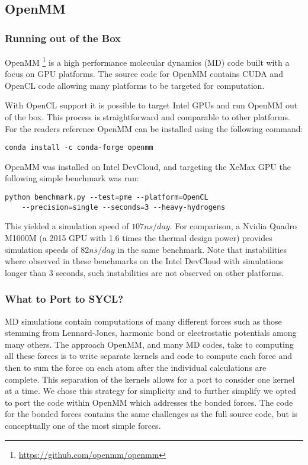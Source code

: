 


\subsection{OpenMM}

\subsubsection{Running out of the Box}

OpenMM \footnote{\url{https://github.com/openmm/openmm}} is a high performance molecular dynamics (MD) code built with a focus on GPU platforms. The source code for OpenMM contains CUDA and OpenCL code allowing many platforms to be targeted for computation.

With OpenCL support it is possible to target Intel GPUs and run OpenMM out of the box. This process is straightforward and comparable to other platforms. For the readers reference OpenMM can be installed using the following command:

\begin{lstlisting}
conda install -c conda-forge openmm
\end{lstlisting}

OpenMM was installed on Intel DevCloud, and targeting the XeMax GPU the following simple benchmark was run:

\begin{lstlisting}
python benchmark.py --test=pme --platform=OpenCL
    --precision=single --seconds=3 --heavy-hydrogens
\end{lstlisting}

This yielded a simulation speed of $107 ns/day$. For comparison, a Nvidia Quadro M1000M (a 2015 GPU with 1.6 times the thermal design power) provides simulation speeds of $82 ns/day$ in the same benchmark. Note that instabilities where observed in these benchmarks on the Intel DevCloud with simulations longer than 3 seconds, such instabilities are not observed on other platforms.

\subsubsection{What to Port to SYCL?}

MD simulations contain computations of many different forces such as those stemming from Lennard-Jones, harmonic bond or electrostatic potentials among many others. The approach OpenMM, and many MD codes, take to computing all these forces is to write separate kernels and code to compute each force and then to sum the force on each atom after the individual calculations are complete. This separation of the kernels allows for a port to consider one kernel at a time. We chose this strategy for simplicity and to further simplify we opted to port the code within OpenMM which addresses the bonded forces. The code for the bonded forces contains the same challenges as the full source code, but is conceptually one of the most simple forces.

